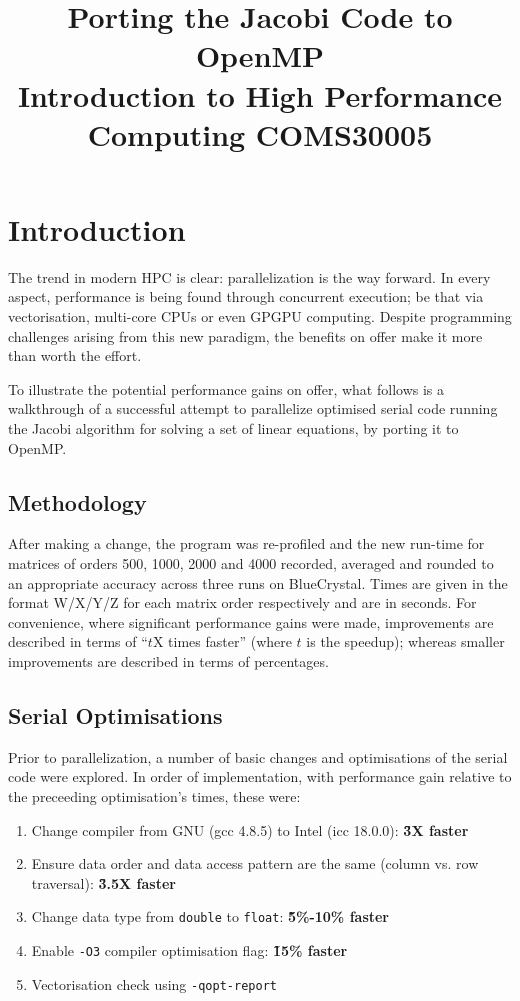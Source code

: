 \documentclass{article}
\begin{document}
\title{Porting the Jacobi Code to OpenMP \\
{\large Introduction to High Performance Computing COMS30005}}
\maketitle

\section{Introduction}
The trend in modern HPC is clear: parallelization is the way
forward. In every aspect, performance is being found through
concurrent execution; be that via vectorisation, multi-core CPUs or
even GPGPU computing. Despite programming challenges arising from this
new paradigm, the benefits on offer make it more than worth the
effort.

To illustrate the potential performance gains on offer, what follows
is a walkthrough of a successful attempt to parallelize optimised
serial code running the Jacobi algorithm for solving a set of linear
equations, by porting it to OpenMP.

\subsection{Methodology} After making a change, the program was
re-profiled and the new run-time for matrices of orders 500, 1000,
2000 and 4000 recorded, averaged and rounded to an appropriate
accuracy across three runs on BlueCrystal. Times are given in the
format W/X/Y/Z for each matrix order respectively and are in
seconds. For convenience, where significant performance gains were
made, improvements are described in terms of ``\(t\)X times faster''
(where \(t\) is the speedup); whereas smaller improvements are
described in terms of percentages.

\subsection{Serial Optimisations}
Prior to parallelization, a number of basic changes and optimisations
of the serial code were explored. In order of implementation, with
performance gain relative to the preceeding optimisation's times,
these were:

\begin{enumerate}
\item Change compiler from GNU (gcc 4.8.5) to Intel (icc 18.0.0): \textbf{\~3X
  faster}
\item Ensure data order and data access pattern are the same (column
  vs. row traversal): \textbf{\~3.5X faster}
\item Change data type from \texttt{double} to \texttt{float}:
  \textbf{\~5\%-10\% faster}
\item Enable \texttt{-O3} compiler optimisation flag: \textbf{\~15\% faster}
\item Vectorisation check using \texttt{-qopt-report}
\end{enumerate}
\end{document}
